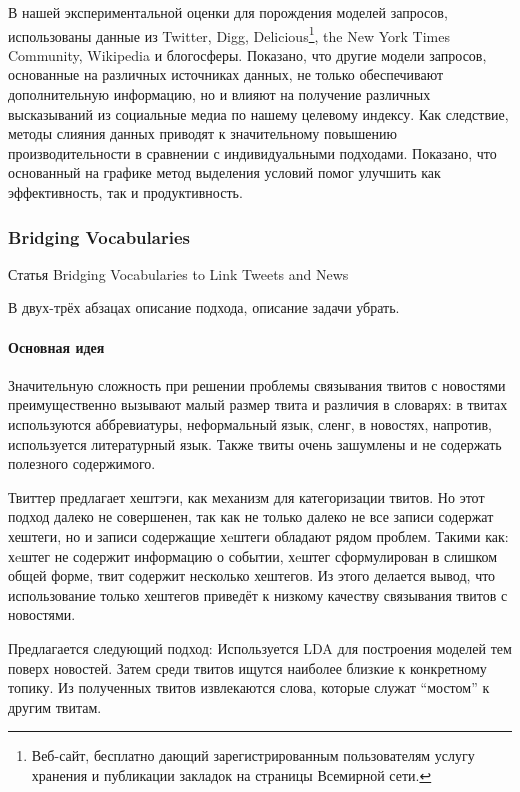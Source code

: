            В нашей экспериментальной оценки для порождения моделей запросов, использованы данные из Twitter, Digg, Delicious\footnote{Веб-сайт, бесплатно дающий зарегистрированным пользователям услугу хранения и публикации закладок на страницы Всемирной сети.}, the New York Times Community, Wikipedia и блогосферы.
            Показано, что другие модели запросов, основанные на различных источниках данных, не только обеспечивают дополнительную информацию, но и влияют на получение различных высказываний из социальные медиа по нашему целевому индексу.
            Как следствие, методы слияния данных приводят к значительному повышению производительности в сравнении с индивидуальными подходами.
            Показано, что основанный на графике метод выделения условий помог улучшить как эффективность, так и продуктивность.

    \subsubsection{Bridging Vocabularies}
        Статья Bridging Vocabularies to Link Tweets and News

        В двух-трёх абзацах описание подхода, описание задачи убрать.

        \paragraph{Основная идея}
            Значительную сложность при решении проблемы связывания твитов с новостями преимущественно вызывают малый размер твита и различия в словарях: в твитах используются аббревиатуры, неформальный язык, сленг, в новостях, напротив, используется литературный язык. Также твиты очень зашумлены и не содержать полезного содержимого.

            Твиттер предлагает хештэги, как механизм для категоризации твитов. Но этот подход далеко не совершенен, так как не только далеко не все записи содержат хештеги, но и записи содержащие хeштеги обладают рядом проблем. Такими как: хeштег не содержит информацию о событии, хeштег сформулирован в слишком общей форме, твит содержит несколько хештегов. Из этого делается вывод, что использование только хештегов приведёт к низкому качеству связывания твитов с новостями.

            Предлагается следующий подход:
            Используется LDA для построения моделей тем поверх новостей. Затем среди твитов ищутся наиболее близкие к конкретному топику. Из полученных твитов извлекаются слова, которые служат ``мостом'' к другим твитам.

